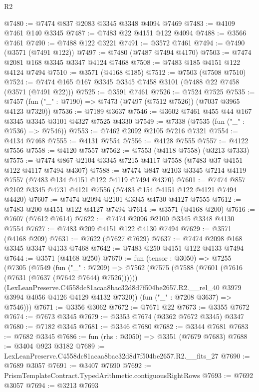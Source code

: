 \begin{lexlean}{R2}
\begin{coremodule}
@7480 := @7474 @837 @2083 @3345 @3348 @4094 @7469
@7483 := @4109 @7461 @140 @3345
@7487 := @7483 @22 @4151 @122 @4094
@7488 := @3566 @7461
@7490 := @7488 @122 @3221
@7491 := @3572 @7461
@7494 := @7490 (@3571 (@7491 @122))
@7497 := @7480 (@7487 @7494 @4170)
@7503 := @7474 @2081 @168 @3345 @3347 @4124 @7468
@7508 := @7483 @185 @4151 @122 @4124 @7494
@7510 := @3571 (@4168 @185)
@7512 := @7503 (@7508 @7510)
@7524 := @7474 @165 @167 @3345 @3345 @7458 @3101 (@7488 @22 @7458 (@3571 (@7491 @22)))
@7525 := @3591 @7461
@7526 := @7524 @7525
@7535 := @7457 (fun ("_" : @7190) => @7473 (@7497 (@7512 @7526)) (@7037 @3965 @4123 @7320))
@7536 := @7189 @3637
@7546 := @3602 @7461 @455 @44 @167 @3345 @3345 @3101 @4327 @7525 @4330
@7549 := @7338 (@7535 (fun ("_" : @7536) => @7546))
@7553 := @7462 @2092 @2105 @7216 @7321
@7554 := @4134 @7468
@7555 := @4131 @7554
@7556 := @4128 @7555
@7557 := @4122 @7556
@7558 := @4120 @7557
@7562 := @7553 (@4118 @7558) (@3213 @7333)
@7575 := @7474 @867 @2104 @3345 @7215 @4117 @7558 (@7483 @37 @4151 @122 @4117 @7494 @4307)
@7588 := @7474 @847 @2103 @3345 @7214 @4119 @7557 (@7483 @134 @4151 @122 @4119 @7494 @4370)
@7601 := @7474 @857 @2102 @3345 @4731 @4121 @7556 (@7483 @154 @4151 @122 @4121 @7494 @4420)
@7607 := @7474 @2094 @2101 @3345 @4730 @4127 @7555
@7612 := @7483 @200 @4151 @122 @4127 @7494
@7614 := @3571 (@4168 @200)
@7616 := @7607 (@7612 @7614)
@7622 := @7474 @2096 @2100 @3345 @3348 @4130 @7554
@7627 := @7483 @209 @4151 @122 @4130 @7494
@7629 := @3571 (@4168 @209)
@7631 := @7622 (@7627 @7629)
@7637 := @7474 @2098 @168 @3345 @3347 @4133 @7468
@7642 := @7483 @250 @4151 @122 @4133 @7494
@7644 := @3571 (@4168 @250)
@7670 := fun (tensor : @3050) =>
  @7255
    (@7305
      (@7549
        (fun ("_" : @7209) =>
        @7562
          (@7575 (@7588 (@7601 (@7616 (@7631 (@7637 (@7642 @7644) @7526))))))
          (LexLeanPreserve.C4558dc81acaa8bac32d8d7f504be2657.R2.__rel_40
            @3979
            @3994
            @4056
            @4126
            @4129
            @4132
            @7320))
        (fun ("_" : @7208 @3637) => @7546)))
@7671 := @3356 @3062
@7672 := @7671 @22
@7673 := @3355 @7672
@7674 := @7673 @3345
@7679 := @3353 @7674 (@3362 @7672 @3345) @3347
@7680 := @7182 @3345
@7681 := @3346 @7680
@7682 := @3344 @7681
@7683 := @7682 @3345
@7686 := fun (rhs : @3050) => @3351 (@7679 @7683)
@7688 := @3404 @923 @3182
@7689 := LexLeanPreserve.C4558dc81acaa8bac32d8d7f504be2657.R2.__fits_27
@7690 := @7689 @3057
@7691 := @3407 @7690
@7692 := PrismTemplateContract.TypedArithmetic.contiguousRightRows
@7693 := @7692 @3057
@7694 := @3213 @7693

\end{coremodule}
\end{lexlean}
